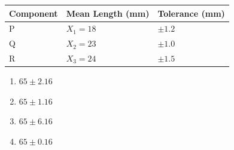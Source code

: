 \documentclass[journal,12pt,onecolumn]{IEEEtran}
\theoremstyle{remark}
\begin{document}
\begin{enumerate}
\begin{tabularx}{\linewidth}{|X|X|X|}
\hline
Component & Mean Length (mm) & Tolerance (mm) \\
\hline 
P & $X_1=18$   & $\pm1.2$   \\
\hline
Q & $X_2=23$  & $\pm1.0$ \\
\hline
R & $X_3=24$ & $\pm1.5$\\
\hline
\end{tabularx}
    \begin{multicols}{4}
    \begin{enumerate}[label=(\Alph*)]
        \item $65\pm2.16$
        \item $65\pm1.16$
        \item $65\pm6.16$
        \item $65\pm0.16$
    \end{enumerate}
\end{multicols}
\vspace{1cm}


















    




    
    \end{enumerate}
\end{document}
